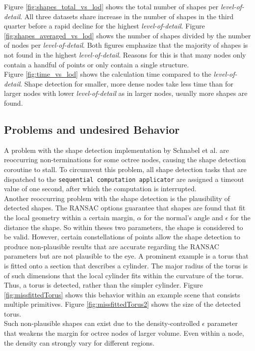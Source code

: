 Figure \ref{fig:shapes_total_vs_lod} shows the total number of shapes per \textit{level-of-detail}. All three datasets share increase in the number of shapes in the third quarter before a rapid decline for the highest \textit{level-of-detail}. Figure \ref{fig:shapes_averaged_vs_lod} shows the number of shapes divided by the number of nodes per \textit{level-of-detail}. Both figures emphasize that the majority of shapes is not found in the highest \textit{level-of-detail}. Reasons for this is that many nodes only contain a handful of points or only contain a single structure. 
\\

Figure \ref{fig:time_vs_lod} shows the calculation time compared to the \textit{level-of-detail}. Shape detection for smaller, more dense nodes take less time than for larger nodes with lower \textit{level-of-detail} as in larger nodes, usually more shapes are found. 


\subsection{Problems and undesired Behavior}

A problem with the shape detection implementation by Schnabel et al. \cite{schnabel-2007-software} are reoccurring non-terminations for some octree nodes, causing the shape detection coroutine to stall. To circumvent this problem, all shape detection tasks that are dispatched to the \verb|sequential computation applicator| are assigned a timeout value of one second, after which the computation is interrupted. 
\\
Another reoccurring problem with the shape detection is the plausibility of detected shapes. The RANSAC options guarantee that shapes are found that fit the local geometry within a certain margin, $\alpha$ for the normal's angle and $\epsilon$ for the distance the shape. So within theses two parameters, the shape is considered to be valid. However, certain constellations of points allow the shape detection to produce non-plausible results that are accurate regarding the RANSAC parameters but are not plausible to the eye. A prominent example is a torus that is fitted onto a section that describes a cylinder. The major radius of the torus is of such dimensions that the local cylinder fits within the curvature of the torus. Thus, a torus is detected, rather than the simpler cylinder. Figure \ref{fig:missfittedTorus} shows this behavior within an example scene that consists multiple primitives. Figure \ref{fig:missfittedTorus2} shows the size of the detected torus. 
\\
Such non-plausible shapes can exist due to the density-controlled $\epsilon$ parameter that weakens the margin for octree nodes of larger volume. Even within a node, the density can strongly vary for different regions. 

